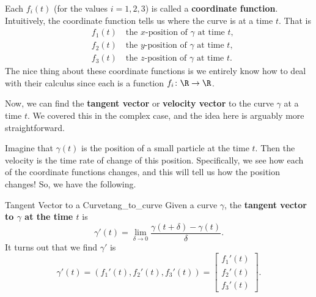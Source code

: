         Each $f_i(t)$ (for the values $i=1,2,3$) is called a \textbf{coordinate function}.  Intuitively, the coordinate function tells us where the curve is at a time $t$. That is
        \begin{align*}
            &f_1(t) \quad \textrm{the $x$-position of $\gamma$ at time $t$,}\\
            &f_2(t) \quad \textrm{the $y$-position of $\gamma$ at time $t$,}\\
            &f_3(t) \quad \textrm{the $z$-position of $\gamma$ at time $t$.}
        \end{align*}
        The nice thing about these coordinate functions is we entirely know how to deal with their calculus since each is a function $f_i\colon \R \to \R$.
        
        Now, we can find the \textbf{tangent vector} or \textbf{velocity vector} to the curve $\gamma$ at a time $t$.  We covered this in the complex case, and the idea here is arguably more straightforward. 
        
        Imagine that $\gamma(t)$ is the position of a small particle at the time $t$.  Then the velocity is the time rate of change of this position.  Specifically, we see how each of the coordinate functions changes, and this will tell us how the position changes! So, we have the following.
        
        \begin{df}{Tangent Vector to a Curve}{tang_to_curve}
        Given a curve $\gamma$, the \textbf{tangent vector to $\gamma$ at the time $t$} is
        \[
        \gamma'(t)=\lim_{\delta \to 0} \frac{\gamma(t+\delta)-\gamma(t)}{\delta}.
        \]
        It turns out that we find $\gamma'$ is
        \[
        \gamma'(t)=(f_1'(t),f_2'(t),f_3'(t))=\begin{bmatrix} f_1'(t)\\ f_2'(t)\\ f_3'(t)\end{bmatrix}.
        \]
        \end{df}
        
